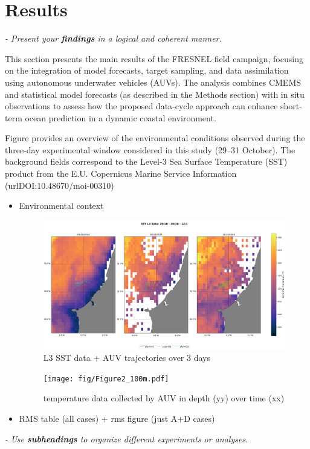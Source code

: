 \section{Results}
\textit{- Present your \textbf{findings} in a logical and coherent manner.}

This section presents the main results of the FRESNEL field campaign, focusing on the integration of model forecasts, target sampling, and data assimilation using autonomous underwater vehicles (AUVs). The analysis combines CMEMS and statistical model forecasts (as described in the Methods section) with in situ observations to assess how the proposed data-cycle approach can enhance short-term ocean prediction in a dynamic coastal environment.

Figure  provides an overview of the environmental conditions observed during the three-day experimental window considered in this study (29–31 October). The background fields correspond to the Level-3 Sea Surface Temperature (SST) product from the E.U. Copernicus Marine Service Information (url{DOI:10.48670/moi-00310})


\begin{itemize}
    \item Environmental context
    
\begin{figure}
    \centering
    \includegraphics[width=1\linewidth]{fig/SST_L3_color1.pdf}
    \caption{L3 SST data + AUV trajectories over 3 days}
    \label{fig:sst}
\end{figure}

\begin{figure}
    \centering
    \texttt{[image: fig/Figure2\_100m.pdf]}
    \caption{temperature data collected by AUV in depth (yy) over time (xx)}
    \label{fig:temperatureprofiles}
\end{figure}
    
    
    \item RMS table (all cases) + rms figure (just A+D cases)
\end{itemize}

 
\textit{- Use \textbf{subheadings} to organize different experiments or analyses.}
